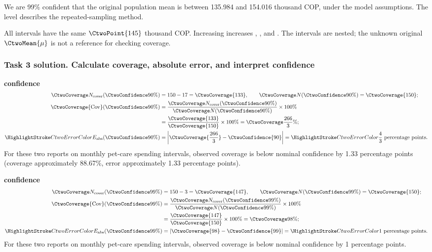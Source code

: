 We are 99\% confident that the original population mean is between 135.984 and 154.016 thousand COP, under the model assumptions. The level describes the repeated-sampling method.

All intervals have the same  $\CtwoPoint{145}$ thousand COP. Increasing  increases , , and . The intervals are nested; the unknown original $\CtwoMean{\mu}$ is not a reference for checking coverage.
\par\vspace{3mm}
\clearpage
\subsubsection*{Task 3 solution. Calculate coverage, absolute error, and interpret confidence}
\label{sol:c2-2-c}
\textbf{ confidence}\nopagebreak[4]
\begin{align*}
\CtwoCoverCount(\CtwoConfidence{90\%})&=150-17=\CtwoCoverage{133},
\qquad\CtwoTotalCount(\CtwoConfidence{90\%})=\CtwoCoverage{150};\\
\CtwoCoverage{\mathrm{Cov}}(\CtwoConfidence{90\%})
&=\frac{\CtwoCoverCount(\CtwoConfidence{90\%})}{\CtwoTotalCount(\CtwoConfidence{90\%})}\times100\%
\\
&=\frac{\CtwoCoverage{133}}{\CtwoCoverage{150}}\times100\%=\CtwoCoverage{\frac{266}{3}\%};\\
\CtwoError{E_{\rm abs}}(\CtwoConfidence{90\%})
&=\left|\CtwoCoverage{\frac{266}{3}}-\CtwoConfidence{90}\right|=\CtwoError{\frac{4}{3}}\ \text{percentage points}.
\end{align*}
For these two reports on monthly pet-care spending intervals, observed coverage is below nominal confidence by 1.33 percentage points (coverage approximately 88.67\%, error approximately 1.33 percentage points).

\textbf{ confidence}\nopagebreak[4]
\begin{align*}
\CtwoCoverCount(\CtwoConfidence{99\%})&=150-3=\CtwoCoverage{147},
\qquad\CtwoTotalCount(\CtwoConfidence{99\%})=\CtwoCoverage{150};\\
\CtwoCoverage{\mathrm{Cov}}(\CtwoConfidence{99\%})
&=\frac{\CtwoCoverCount(\CtwoConfidence{99\%})}{\CtwoTotalCount(\CtwoConfidence{99\%})}\times100\%
\\
&=\frac{\CtwoCoverage{147}}{\CtwoCoverage{150}}\times100\%=\CtwoCoverage{98\%};\\
\CtwoError{E_{\rm abs}}(\CtwoConfidence{99\%})
&=\left|\CtwoCoverage{98}-\CtwoConfidence{99}\right|=\CtwoError{1}\ \text{percentage points}.
\end{align*}
For these two reports on monthly pet-care spending intervals, observed coverage is below nominal confidence by 1 percentage points.

